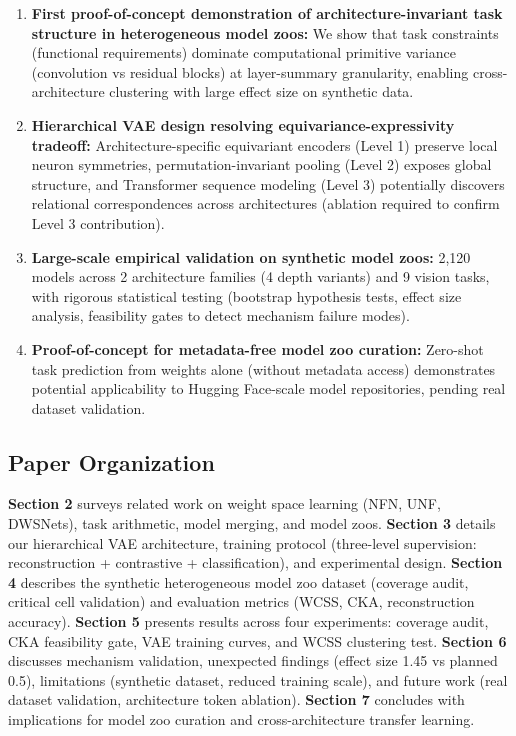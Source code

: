 \begin{enumerate}
\item \textbf{First proof-of-concept demonstration of architecture-invariant task structure in heterogeneous model zoos:} We show that task constraints (functional requirements) dominate computational primitive variance (convolution vs residual blocks) at layer-summary granularity, enabling cross-architecture clustering with large effect size on synthetic data.

\item \textbf{Hierarchical VAE design resolving equivariance-expressivity tradeoff:} Architecture-specific equivariant encoders (Level 1) preserve local neuron symmetries, permutation-invariant pooling (Level 2) exposes global structure, and Transformer sequence modeling (Level 3) potentially discovers relational correspondences across architectures (ablation required to confirm Level 3 contribution).

\item \textbf{Large-scale empirical validation on synthetic model zoos:} 2,120 models across 2 architecture families (4 depth variants) and 9 vision tasks, with rigorous statistical testing (bootstrap hypothesis tests, effect size analysis, feasibility gates to detect mechanism failure modes).

\item \textbf{Proof-of-concept for metadata-free model zoo curation:} Zero-shot task prediction from weights alone (without metadata access) demonstrates potential applicability to Hugging Face-scale model repositories, pending real dataset validation.
\end{enumerate}

\subsection{Paper Organization}

\textbf{Section 2} surveys related work on weight space learning (NFN, UNF, DWSNets), task arithmetic, model merging, and model zoos. \textbf{Section 3} details our hierarchical VAE architecture, training protocol (three-level supervision: reconstruction + contrastive + classification), and experimental design. \textbf{Section 4} describes the synthetic heterogeneous model zoo dataset (coverage audit, critical cell validation) and evaluation metrics (WCSS, CKA, reconstruction accuracy). \textbf{Section 5} presents results across four experiments: coverage audit, CKA feasibility gate, VAE training curves, and WCSS clustering test. \textbf{Section 6} discusses mechanism validation, unexpected findings (effect size 1.45 vs planned 0.5), limitations (synthetic dataset, reduced training scale), and future work (real dataset validation, architecture token ablation). \textbf{Section 7} concludes with implications for model zoo curation and cross-architecture transfer learning.

